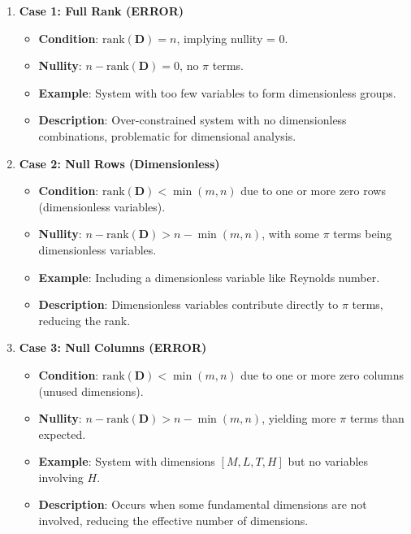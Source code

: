\documentclass[
	11pt, %
	fleqn, %
	a4paper, %
]{LegrandOrangeBook}
\begin{document}
\begin{enumerate}
    \item \textbf{Case 1: Full Rank (ERROR)}
    \begin{itemize}
        \item \textbf{Condition}: $\text{rank}(\mathbf{D}) = n$, implying nullity = 0.
        \item \textbf{Nullity}: $n - \text{rank}(\mathbf{D}) = 0$, no $\pi$ terms.
        \item \textbf{Example}: System with too few variables to form dimensionless groups.
        \item \textbf{Description}: Over-constrained system with no dimensionless combinations, problematic for dimensional analysis.
    \end{itemize}

  \item \textbf{Case 2: Null Rows (Dimensionless)}
    \begin{itemize}
        \item \textbf{Condition}: $\text{rank}(\mathbf{D}) < \min(m, n)$ due to one or more zero rows (dimensionless variables).
        \item \textbf{Nullity}: $n - \text{rank}(\mathbf{D}) > n - \min(m, n)$, with some $\pi$ terms being dimensionless variables.
        \item \textbf{Example}: Including a dimensionless variable like Reynolds number.
        \item \textbf{Description}: Dimensionless variables contribute directly to $\pi$ terms, reducing the rank.
    \end{itemize}

    \item \textbf{Case 3: Null Columns (ERROR)}
    \begin{itemize}
        \item \textbf{Condition}: $\text{rank}(\mathbf{D}) < \min(m, n)$ due to one or more zero columns (unused dimensions).
        \item \textbf{Nullity}: $n - \text{rank}(\mathbf{D}) > n - \min(m, n)$, yielding more $\pi$ terms than expected.
        \item \textbf{Example}: System with dimensions $[M, L, T, H]$ but no variables involving $H$.
        \item \textbf{Description}: Occurs when some fundamental dimensions are not involved, reducing the effective number of dimensions.
    \end{itemize}


\end{enumerate}
\end{document}
